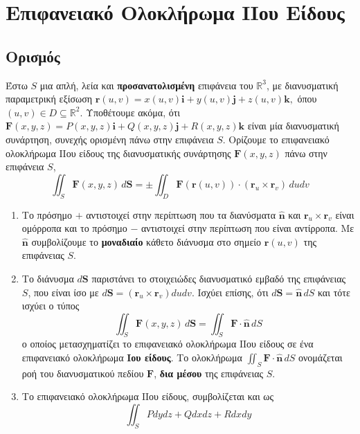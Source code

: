 




\pagestyle{askhseis}



\chapter*{Επιφανειακό Ολοκλήρωμα ΙΙου Είδους}

\setcounter{chapter}{1}

\section{Ορισμός}

Έστω $ S $ μια απλή, λεία και \textbf{προσανατολισμένη} επιφάνεια του 
$ \mathbb{R}^{3} $, με διανυσματική παραμετρική εξίσωση $ \mathbf{r}(u,v) =
x(u,v)\mathbf{i}+y(u,v)\mathbf{j}+z(u,v)\mathbf{k}, $ όπου $ (u,v) \in D \subseteq
\mathbb{R}^{2} $. Υποθέτουμε ακόμα, ότι $ \mathbf{F}(x,y,z) =
P(x,y,z)\mathbf{i}+Q(x,y,z)\mathbf{j}+R(x,y,z)\mathbf{k} $ είναι μία διανυσματική 
συνάρτηση, συνεχής ορισμένη πάνω στην επιφάνεια $S$. Ορίζουμε το 
\textcolor{Col1}{επιφανειακό ολοκλήρωμα ΙΙου είδους} της διανυσματικής συνάρτησης 
$ \mathbf{F}(x,y,z) $ πάνω στην επιφάνεια $S$,
\[
  \iint_{S} \mathbf{F}(x,y,z) \, d \mathbf{S}  = \pm \iint_{D} 
  \mathbf{F}(\mathbf{r}(u,v)) \cdot (\mathbf{r}_{u} \times \mathbf{r}_{v}) \, dudv   
\]

\begin{rems}
\item {}
  \begin{enumerate}
    \item Το πρόσημο $ + $ αντιστοιχεί στην περίπτωση που τα διανύσματα 
      $ \mathbf{\widehat{n}} $ και $ \mathbf{r}_{u} \times \mathbf{r}_{v} $ 
      είναι ομόρροπα και το πρόσημο $ - $ αντιστοιχεί στην περίπτωση που είναι 
      αντίρροπα. Με $ \mathbf{\widehat{n}} $ συμβολίζουμε το \textbf{μοναδιαίο} κάθετο 
      διάνυσμα στο σημείο $ \mathbf{r}(u,v) $ της επιφάνειας $S$.
    \item Το διάνυσμα $ d \mathbf{S} $ παριστάνει το στοιχειώδες διανυσματικό εμβαδό 
      της επιφάνειας $S$, που είναι ίσο με $ d \mathbf{S} = (\mathbf{r}_{u} \times
      \mathbf{r}_{v}) du dv $. Ισχύει επίσης, ότι $ d \mathbf{S} = \mathbf{\widehat{n}}
      \,dS $ και τότε ισχύει ο τύπος 
      \begin{equation}\label{eq:flux1}
        \boxed{\iint_{S} \mathbf{F}(x,y,z) \, d \mathbf{S} = \iint_{S} \mathbf{F} \cdot
        \mathbf{\widehat{n}} \,{dS}}
      \end{equation} 
      ο οποίος μετασχηματίζει το επιφανειακό ολοκλήρωμα ΙΙου είδους σε ένα επιφανειακό 
      ολοκλήρωμα \textbf{Ιου είδους}. Το ολοκλήρωμα $ \iint_{S} \mathbf{F}\cdot
      \mathbf{\widehat{n}} \,{dS} $ ονομάζεται \textcolor{Col1}{ροή} του 
      διανυσματικού πεδίου $ \mathbf{F} $, \textbf{δια μέσου} της επιφάνειας $S$.
    \item Το επιφανειακό ολοκλήρωμα ΙΙου είδους, συμβολίζεται και ως 
      \[
        \iint_{S} Pdydz + Qdxdz + Rdxdy 
      \] 
  \end{enumerate}
\end{rems} 

